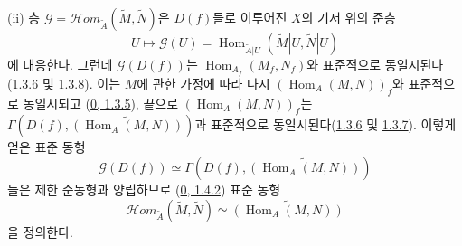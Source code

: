 (ii) 층
$\mathscr{G}=\mathscr{H}\!om_{\widetilde{A}}(\widetilde{M},
\widetilde{N})$은 $D(f)$들로 이루어진 $X$의 기저 위의 준층
\[
  U\longmapsto\mathscr{G}(U)
  =\operatorname{Hom}_{\widetilde{A}|U}
  (\widetilde{M}|U,\widetilde{N}|U)
\]
에 대응한다. 그런데 $\mathscr{G}(D(f))$는
$\operatorname{Hom}_{A_f}(M_f,N_f)$와 표준적으로 동일시된다
(\hyperref[I.1.3.6-ko]{1.3.6} 및
\hyperref[I.1.3.8-ko]{1.3.8}). 이는 $M$에 관한 가정에 따라 다시
$(\operatorname{Hom}_A(M,N))_f$와 표준적으로 동일시되고
(\hyperref[0.1.3.5-ko]{0, 1.3.5}), 끝으로
$(\operatorname{Hom}_A(M,N))_f$는
$\Gamma(D(f),\widetilde{(\operatorname{Hom}_A(M,N))})$과
표준적으로 동일시된다(\hyperref[I.1.3.6-ko]{1.3.6} 및
\hyperref[I.1.3.7-ko]{1.3.7}). 이렇게 얻은 표준 동형
\[
  \mathscr{G}(D(f))\simeq
  \Gamma(D(f),\widetilde{(\operatorname{Hom}_A(M,N))})
\]
들은 제한 준동형과 양립하므로
(\hyperref[0.1.4.2-ko]{0, 1.4.2}) 표준 동형
\[
  \mathscr{H}\!om_{\widetilde{A}}(\widetilde{M},\widetilde{N})
  \simeq\widetilde{(\operatorname{Hom}_A(M,N))}
\]
을 정의한다.


